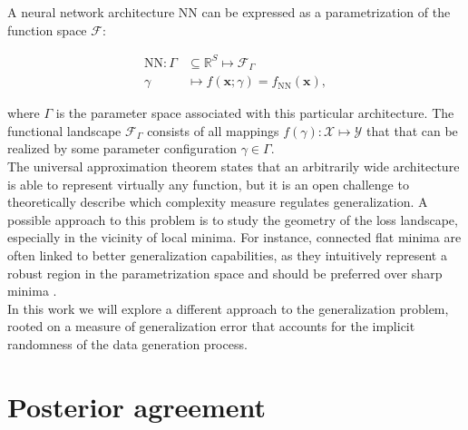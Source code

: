




A neural network architecture $\text{NN}$ can be expressed as a parametrization of the function space $\mathcal{F}$:

$$
    \begin{aligned}
        \text{NN}: \Gamma & \subseteq \mathbb{R}^{S} \longmapsto \mathcal{F}_{\Gamma} \\
        \gamma & \longmapsto f(\bm{x}; \gamma) = f_{\text{NN}}(\bm{x}),
    \end{aligned}
$$

where $\Gamma$ is the parameter space associated with this particular architecture. The functional
landscape $\mathcal{F}_{\Gamma}$ consists of all mappings $f(\gamma): \mathcal{X} \longmapsto \mathcal{Y}$ that 
that can be realized by some parameter configuration $\gamma \in \Gamma$. \\

The universal approximation theorem states that an arbitrarily wide architecture
is able to represent virtually any function, but it is an open challenge to theoretically describe which
complexity measure regulates generalization. A possible approach to this problem is to
study the geometry of the loss landscape, especially in the vicinity of local minima. For instance, 
connected flat minima are often linked to better generalization capabilities, as they
intuitively represent a robust region in the parametrization space and should be 
preferred over sharp minima
\cite{jimenezInductiveBiasDeep}. \\

In this work we will explore a different approach to the generalization problem, rooted on
a measure of generalization error that accounts for the implicit randomness of the data
generation process.

\section{Posterior agreement}

